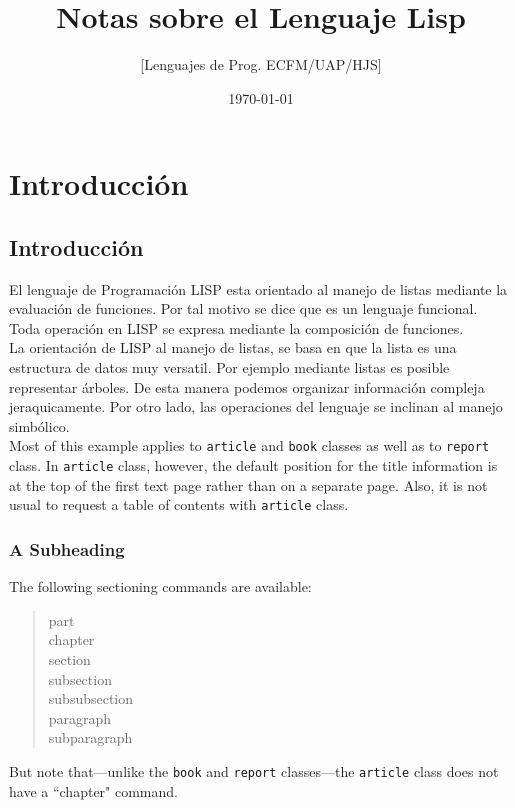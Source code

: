 \documentclass[11pt]{book}              %
\title{\bf Notas sobre el Lenguaje Lisp}    %
\author{[Lenguajes de Prog. ECFM/UAP/HJS]}              %
\date{\today}                           %
\begin{document}
\frontmatter                            %
\maketitle                              %
\tableofcontents                        %
\mainmatter                             %
\part{Introducci\'on}                   %
\chapter{Introducci\'on}                %

El lenguaje de Programaci\'on  LISP esta orientado al manejo de listas mediante la evaluaci\'on de funciones. Por tal motivo se dice que es un lenguaje funcional. Toda  operaci\'on en LISP se expresa mediante la composici\'on de funciones.\\
La orientaci\'on  de LISP al manejo de listas, se basa en que la lista es una estructura de datos muy versatil. Por ejemplo mediante listas es posible representar  \'arboles. De esta manera podemos organizar informaci\'on compleja jeraquicamente. Por otro lado, las operaciones  del lenguaje se inclinan al manejo simb\'olico.\\


Most of this example applies to \texttt{article} and \texttt{book} classes
as well as to \texttt{report} class. In \texttt{article} class, however,
the default position for the title information is at the top of
the first text page rather than on a separate page. Also, it is
not usual to request a table of contents with \texttt{article} class.
 
\section{A Subheading}                  %
The following sectioning commands are available:
\begin{quote}                           %
 part \\                                %
 chapter \\                             %
 section \\ 
 subsection \\ 
 subsubsection \\ 
 paragraph \\ 
 subparagraph 
\end{quote}                             %
But note that---unlike the \texttt{book} and \texttt{report} classes---the
\texttt{article} class does not have a ``chapter" command.
 
\end{document}

